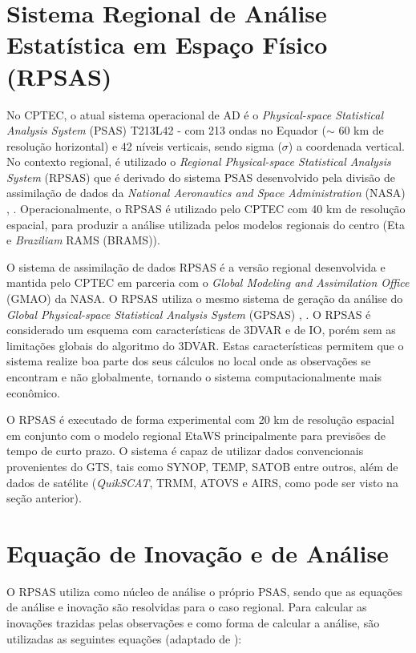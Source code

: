 \section{Sistema Regional de Análise Estatística em Espaço Físico (RPSAS)}
\label{ss:rpsas}

No CPTEC, o atual sistema operacional de AD é o \textit{Physical-space Statistical Analysis System} (PSAS) T213L42 - com 213 ondas no Equador ($\sim$ 60 km de resolução horizontal) e 42 níveis verticais, sendo sigma ($\sigma$) a coordenada vertical. No contexto regional, é utilizado o \textit{Regional Physical-space Statistical Analysis System} (RPSAS) que é derivado do sistema PSAS desenvolvido pela divisão de assimilação de dados da \textit{National Aeronautics and Space Administration} (NASA) \cite{dasilvaetal95}, \cite{courtier97}. Operacionalmente, o RPSAS é utilizado pelo CPTEC com 40 km de resolução espacial, para produzir a análise utilizada pelos modelos regionais do centro (Eta e \textit{Braziliam} RAMS (BRAMS)).

O sistema de assimilação de dados RPSAS é a versão regional desenvolvida e mantida pelo CPTEC em parceria com o \textit{Global Modeling and Assimilation Office} (GMAO) da NASA. O RPSAS utiliza o mesmo sistema de geração da análise do \textit{Global Physical-space Statistical Analysis System} (GPSAS) \cite{dasilvaetal95}, \cite{cohnetal98}. O RPSAS é considerado um esquema com características de 3DVAR e de IO, porém sem as limitações globais do algoritmo do 3DVAR. Estas características permitem que o sistema realize boa parte dos seus cálculos no local onde as observações se encontram e não globalmente, tornando o sistema computacionalmente mais econômico. 

O RPSAS é executado de forma experimental com 20 km de resolução espacial em conjunto com o modelo regional EtaWS principalmente para previsões de tempo de curto prazo. O sistema é capaz de utilizar dados convencionais provenientes do GTS, tais como SYNOP, TEMP, SATOB entre outros, além de dados de satélite (\textit{QuikSCAT}, TRMM, ATOVS e AIRS, como pode ser visto na seção anterior).

\section{Equação de Inovação e de Análise}
\label{ss:eqinovanl}

O RPSAS utiliza como núcleo de análise o próprio PSAS, sendo que as equações de análise e inovação são resolvidas para o caso regional. Para calcular as inovações trazidas pelas observações e como forma de calcular a análise, são utilizadas as seguintes equações (adaptado de \cite{larsonetal98}):

